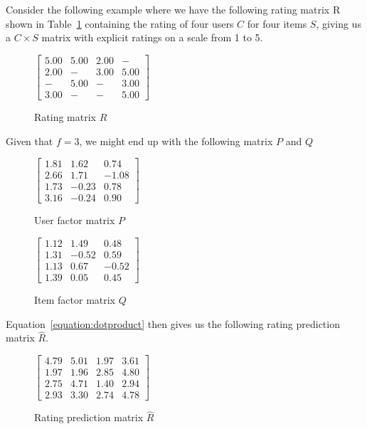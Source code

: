 Consider the following example where we have the following rating matrix R
shown in Table~\ref{table:ratingMatrix} containing the rating of four users $C$
for four items $S$, giving us a $C \times S$ matrix with explicit ratings on a
  scale from 1 to 5.

\begin{figure}[H]
	\centering
	$
	\begin{bmatrix}
		5.00    & 5.00  & 2.00 & -    \\
		2.00    & -     & 3.00 & 5.00 \\
		-       & 5.00  & -    & 3.00 \\
		3.00    & -     & -    & 5.00
	\end{bmatrix}
	$
	\caption{Rating matrix $R$}
	\label{table:ratingMatrix}
\end{figure}

Given that $f = 3$, we might end up with the following matrix $P$ and $Q$

\begin{figure}[H]
\centering
$
\begin{bmatrix}
1.81    &1.62   &0.74\\
2.66    &1.71   &-1.08\\
1.73    &-0.23  &0.78\\
3.16    &-0.24  &0.90
\end{bmatrix}
$
\caption{User factor matrix $P$}
\end{figure}

\begin{figure}[H]
\centering
$
\begin{bmatrix}
1.12    &	1.49   &	0.48\\
1.31    &	-0.52  &	0.59\\
1.13    &	0.67	&	-0.52\\
1.39    &	0.05	&	0.45
\end{bmatrix}
$
\caption{Item factor matrix $Q$}
\end{figure}

Equation~\ref{equation:dotproduct} then gives us the following rating prediction matrix $\hat{R}$.

\begin{figure}[H]
\centering
$
\begin{bmatrix}
4.79    &5.01   &1.97   &3.61 \\
1.97    &1.96   &2.85   &4.80 \\
2.75    &4.71   &1.40   &2.94 \\
2.93    &3.30   &2.74   &4.78
\end{bmatrix}
$
\caption{Rating prediction matrix $\hat{R}$}
\end{figure}



